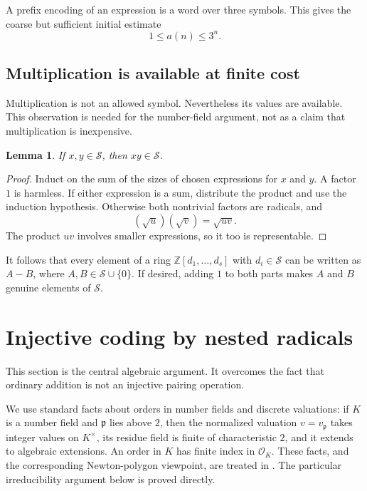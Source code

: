 \documentclass[11pt,letterpaper]{article}
\numberwithin{equation}{section}
\newtheorem{lemma}[theorem]{Lemma}
\theoremstyle{definition}
\newcommand{\Sset}{\mathcal S}
\newcommand{\Z}{\mathbb Z}
\newcommand{\OK}{\mathcal O_K}
\begin{document}
A prefix encoding of an expression is a word over three symbols. This gives
the coarse but sufficient initial estimate
\begin{equation}\label{eq:coarse}
 1\le a(n)\le 3^n.
\end{equation}

\subsection{Multiplication is available at finite cost}

Multiplication is not an allowed symbol. Nevertheless its values are available.
This observation is needed for the number-field argument, not as a claim that
multiplication is inexpensive.

\begin{lemma}\label{lem:mult}
If $x,y\in\Sset$, then $xy\in\Sset$.
\end{lemma}
\begin{proof}
Induct on the sum of the sizes of chosen expressions for $x$ and $y$.
A factor $1$ is harmless. If either expression is a sum, distribute the product
and use the induction hypothesis. Otherwise both nontrivial factors are
radicals, and
\[
 (\sqrt u)(\sqrt v)=\sqrt{uv}.
\]
The product $uv$ involves smaller expressions, so it too is representable.
\end{proof}

It follows that every element of a ring $\Z[d_1,\ldots,d_s]$ with
$d_i\in\Sset$ can be written as $A-B$, where $A,B\in\Sset\cup\{0\}$.
If desired, adding $1$ to both parts makes $A$ and $B$ genuine elements of
$\Sset$.

\section{Injective coding by nested radicals}

This section is the central algebraic argument. It overcomes the fact that
ordinary addition is not an injective pairing operation.

We use standard facts about orders in number fields and discrete valuations:
if $K$ is a number field and $\mathfrak p$ lies above $2$, then the normalized
valuation $v=v_{\mathfrak p}$ takes integer values on $K^\times$, its residue
field is finite of characteristic $2$, and it extends to algebraic extensions.
An order in $K$ has finite index in $\OK$. These facts, and the corresponding
Newton-polygon viewpoint, are treated in \cite[Chapters 2, 3, and 7]{milne}.
The particular irreducibility argument below is proved directly.
\end{document}
